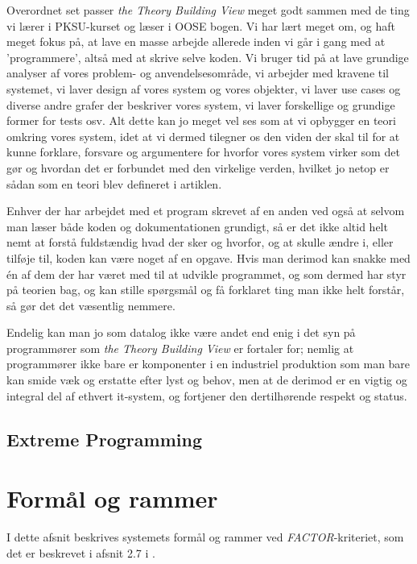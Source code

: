 \documentclass[11pt, a4paper]{article}
\begin{document}
Overordnet set passer \emph{the Theory Building View} meget godt sammen med de ting vi lærer i PKSU-kurset og læser i OOSE\cite{OOSE} bogen. Vi har lært meget om, og haft meget fokus på, at lave en masse arbejde allerede inden vi går i gang med at 'programmere', altså med at skrive selve koden. Vi bruger tid på at lave grundige analyser af vores problem- og anvendelsesområde, vi arbejder med kravene til systemet, vi laver design af vores system og vores objekter, vi laver use cases og diverse andre grafer der beskriver vores system, vi laver forskellige og grundige former for tests osv. Alt dette kan jo meget vel ses som at vi opbygger en teori omkring vores system, idet at vi dermed tilegner os den viden der skal til for at kunne forklare, forsvare og argumentere for hvorfor vores system virker som det gør og hvordan det er forbundet med den virkelige verden, hvilket jo netop er sådan som en teori blev defineret i artiklen.

Enhver der har arbejdet med et program skrevet af en anden ved også at selvom man læser både koden og dokumentationen grundigt, så er det ikke altid helt nemt at forstå fuldstændig hvad der sker og hvorfor, og at skulle ændre i, eller tilføje til, koden kan være noget af en opgave. Hvis man derimod kan snakke med én af dem der har været med til at udvikle programmet, og som dermed har styr på teorien bag, og kan stille spørgsmål og få forklaret ting man ikke helt forstår, så gør det det væsentlig nemmere.

Endelig kan man jo som datalog ikke være andet end enig i det syn på programmører som \emph{the Theory Building View} er fortaler for; nemlig at programmører ikke bare er komponenter i en industriel produktion som man bare kan smide væk og erstatte efter lyst og behov, men at de derimod er en vigtig og integral del af ethvert it-system, og fortjener den dertilhørende respekt og status.

\subsection{Extreme Programming}
\label{sub:extreme_programming}

\newpage

\section{Formål og rammer}
\label{sec:formal_og_rammer}
I dette afsnit beskrives systemets formål og rammer ved \textit{FACTOR}-kriteriet, som det er beskrevet i afsnit 2.7 i \cite{mathiassen2000object}.
\end{document}
